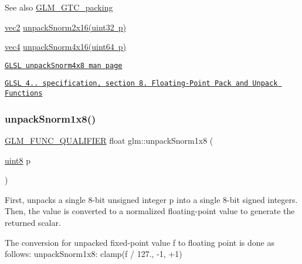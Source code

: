 \begin{DoxySeeAlso}{See also}
\mbox{\hyperlink{group__gtc__packing}{G\+L\+M\+\_\+\+G\+T\+C\+\_\+packing}} 

\mbox{\hyperlink{group__core__types_gaa1618f51db67eaa145db101d8c8431d8}{vec2}} \mbox{\hyperlink{group__core__func__packing_gacd8f8971a3fe28418be0d0fa1f786b38}{unpack\+Snorm2x16(uint32 p)}} 

\mbox{\hyperlink{group__core__types_ga5881b1b022d7fd1b7218f5916532dd02}{vec4}} \mbox{\hyperlink{group__gtc__packing_ga1bfaa3f217fd7a4b6b9d3117ecb3fcac}{unpack\+Snorm4x16(uint64 p)}} 

\href{http://www.opengl.org/sdk/docs/manglsl/xhtml/unpackSnorm1x16.xml}{\tt G\+L\+SL unpack\+Snorm4x8 man page} 

\href{http://www.opengl.org/registry/doc/GLSLangSpec.4.20.8.pdf}{\tt G\+L\+SL 4.. specification, section 8. Floating-\/\+Point Pack and Unpack Functions} 
\end{DoxySeeAlso}
\mbox{\label{group__gtc__packing_ga6f2bebf536fbf7c8b97d4b306bb3354e}} 
\subsubsection{\texorpdfstring{unpack\+Snorm1x8()}{unpackSnorm1x8()}}
{\footnotesize\ttfamily \mbox{\hyperlink{setup_8hpp_a33fdea6f91c5f834105f7415e2a64407}{G\+L\+M\+\_\+\+F\+U\+N\+C\+\_\+\+Q\+U\+A\+L\+I\+F\+I\+ER}} float glm\+::unpack\+Snorm1x8 (\begin{DoxyParamCaption}\item[{\mbox{\hyperlink{group__gtc__type__precision_ga1a7dcd8aac97cc8020817c94049deff2}{uint8}}}]{p }\end{DoxyParamCaption})}

First, unpacks a single 8-\/bit unsigned integer p into a single 8-\/bit signed integers. Then, the value is converted to a normalized floating-\/point value to generate the returned scalar.

The conversion for unpacked fixed-\/point value f to floating point is done as follows\+: unpack\+Snorm1x8\+: clamp(f / 127., -\/1, +1)

